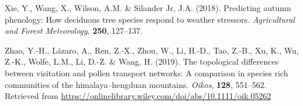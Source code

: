 \documentclass[
]{article}
\newlength{\cslhangindent}
\newlength{\cslentryspacingunit} %
\newenvironment{CSLReferences}[2] %
 {%
  \setlength{\parindent}{0pt}
  \ifodd #1
  \let\oldpar\par
  \def\par{\hangindent=\cslhangindent\oldpar}
  \fi
  \setlength{\parskip}{#2\cslentryspacingunit}
 }%
 {}
\begin{document}
\begin{CSLReferences}{1}{0}
\leavevmode{}%
Xie, Y., Wang, X., Wilson, A.M. \& Silander Jr, J.A. (2018). Predicting
autumn phenology: How deciduous tree species respond to weather
stressors. \emph{Agricultural and Forest Meteorology}, \textbf{250},
127--137.

\leavevmode{}%
Zhao, Y.-H., Lázaro, A., Ren, Z.-X., Zhou, W., Li, H.-D., Tao, Z.-B.,
Xu, K., Wu, Z.-K., Wolfe, L.M., Li, D.-Z. \& Wang, H. (2019). The
topological differences between visitation and pollen transport
networks: A comparison in species rich communities of the
himalaya--hengduan mountains. \emph{Oikos}, \textbf{128}, 551--562.
Retrieved from
\url{https://onlinelibrary.wiley.com/doi/abs/10.1111/oik.05262}

\end{CSLReferences}
\end{document}
